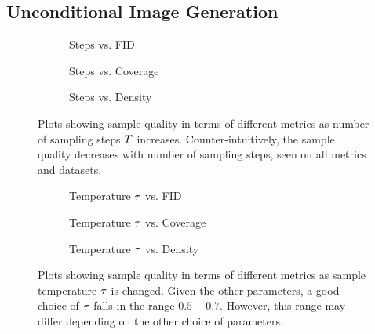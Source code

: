
\subsection{Unconditional Image Generation}
\label{subsec:evaluationUnconditional}

\begin{figure}
    \centering
    \begin{subfigure}[b]{0.33\textwidth}
        \centering
        \resizebox{\textwidth}{!}{
            
        }
        \caption{Steps vs. FID}
    \end{subfigure}
    \hfill
    \begin{subfigure}[b]{0.33\textwidth}
        \centering
        \resizebox{\textwidth}{!}{
            
        }
        \caption{Steps vs. Coverage}
    \end{subfigure}
    \hfill
    \begin{subfigure}[b]{0.33\textwidth}
        \centering
        \resizebox{\textwidth}{!}{
            
        }
        \caption{Steps vs. Density}
    \end{subfigure}
    \caption{
        Plots showing sample quality in terms of different metrics as
        number of sampling steps $T$ increases. Counter-intuitively, the
        sample quality decreases with number of sampling steps, seen on
        all metrics and datasets.
    }
    \label{fig:step}
\end{figure}

\begin{figure}
    \begin{subfigure}[b]{0.33\textwidth}
        \centering
        \resizebox{\textwidth}{!}{
            
        }
        \caption{Temperature $\tau$ vs. FID}
    \end{subfigure}
    \hfill
    \begin{subfigure}[b]{0.33\textwidth}
        \centering
        \resizebox{\textwidth}{!}{
            
        }
        \caption{Temperature $\tau$ vs. Coverage}
    \end{subfigure}
    \hfill
    \begin{subfigure}[b]{0.33\textwidth}
        \centering
        \resizebox{\textwidth}{!}{
            
        }
        \caption{Temperature $\tau$ vs. Density}
    \end{subfigure}
    \caption{
        Plots showing sample quality in terms of different metrics as sample
        temperature $\tau$ is changed. Given the other parameters, a good choice
        of $\tau$ falls in the range $0.5-0.7$. However, this range may
        differ depending on the other choice of parameters.
    }
    \label{fig:temp}
\end{figure}

